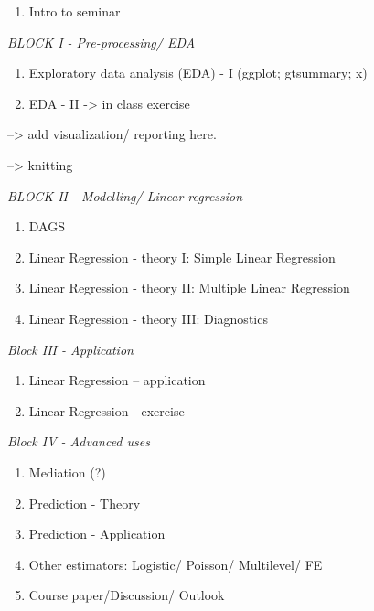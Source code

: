 \documentclass[
]{book}
\providecommand{\tightlist}{%
  \setlength{\itemsep}{0pt}\setlength{\parskip}{0pt}}
\begin{document}
\begin{enumerate}
\def\labelenumi{\arabic{enumi}.}
\tightlist
\item
  Intro to seminar
\end{enumerate}

\emph{BLOCK I - Pre-processing/ EDA}

\begin{enumerate}
\def\labelenumi{\arabic{enumi}.}
\setcounter{enumi}{1}
\tightlist
\item
  Exploratory data analysis (EDA) - I (ggplot; gtsummary; x)
\item
  EDA - II -\textgreater{} in class exercise
\end{enumerate}

--\textgreater{} add visualization/ reporting here.

--\textgreater{} knitting

\emph{BLOCK II - Modelling/ Linear regression}

\begin{enumerate}
\def\labelenumi{\arabic{enumi}.}
\setcounter{enumi}{3}
\tightlist
\item
  DAGS
\item
  Linear Regression - theory I: Simple Linear Regression
\item
  Linear Regression - theory II: Multiple Linear Regression
\item
  Linear Regression - theory III: Diagnostics
\end{enumerate}

\emph{Block III - Application}

\begin{enumerate}
\def\labelenumi{\arabic{enumi}.}
\setcounter{enumi}{7}
\tightlist
\item
  Linear Regression -- application
\item
  Linear Regression - exercise
\end{enumerate}

\emph{Block IV - Advanced uses}

\begin{enumerate}
\def\labelenumi{\arabic{enumi}.}
\setcounter{enumi}{9}
\item
  Mediation (?)
\item
  Prediction - Theory
\item
  Prediction - Application
\item
  Other estimators: Logistic/ Poisson/ Multilevel/ FE
\item
  Course paper/Discussion/ Outlook
\end{enumerate}
\end{document}
